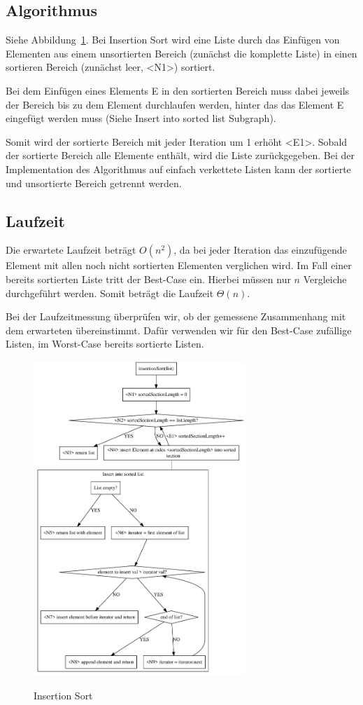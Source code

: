 \documentclass[11pt]{article}
\begin{document}
    \subsection{Algorithmus}\label{subsec:Ialgorithmus}
    Siehe Abbildung~\ref{fig:insertionS}.
    Bei Insertion Sort wird eine Liste durch das Einfügen von Elementen aus
    einem unsortierten Bereich (zunächst die komplette Liste) in einen sortieren
    Bereich (zunächst leer, <N1>) sortiert.

    Bei dem Einfügen eines Elements E in den sortierten Bereich muss dabei
    jeweils der Bereich bis zu dem Element durchlaufen werden, hinter das das
    Element E eingefügt werden muss (Siehe \frqq Insert into sorted list\flqq
    Subgraph).

    Somit wird der sortierte Bereich mit jeder Iteration um 1 erhöht <E1>.
    Sobald der sortierte Bereich alle Elemente enthält, wird die Liste
    zurückgegeben.
    Bei der Implementation des Algorithmus auf einfach verkettete Listen
    kann der sortierte und unsortierte Bereich getrennt werden.

    \subsection{Laufzeit}\label{subsec:Ilaufzeit}
    Die erwartete Laufzeit beträgt \(O(n^2)\), da bei jeder Iteration das
    einzufügende Element mit allen noch nicht sortierten Elementen verglichen
    wird.
    Im Fall einer bereits sortierten Liste tritt der Best-Case ein.
    Hierbei müssen nur \(n\) Vergleiche durchgeführt werden.
    Somit beträgt die Laufzeit \(\Theta(n)\).

    Bei der Laufzeitmessung überprüfen wir, ob der gemessene Zusammenhang mit
    dem erwarteten übereinstimmt.
    Dafür verwenden wir für den Best-Case zufällige Listen, im Worst-Case
    bereits sortierte Listen.

    \begin{figure}[hbt]
        \caption{Insertion Sort}
        \centering
        \includegraphics[width = 8cm]{insertionS}\label{fig:insertionS}
    \end{figure}
\end{document}
